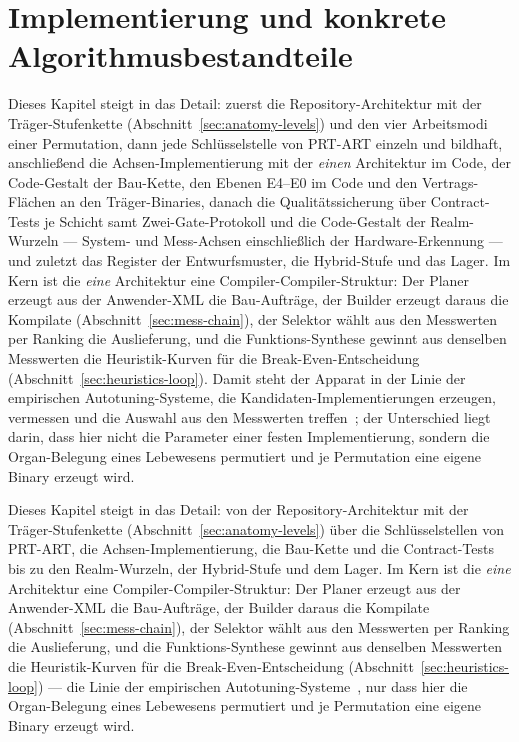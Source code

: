 \chapter{Implementierung und konkrete Algorithmusbestandteile}\label{ch:impl}

\begin{nurlang}
Dieses Kapitel steigt in das Detail: zuerst die Repository-Architektur mit der Träger-Stufenkette
(Abschnitt~\ref{sec:anatomy-levels}) und den vier Arbeitsmodi einer Permutation, dann jede Schlüsselstelle
von PRT-ART einzeln und bildhaft, anschließend die Achsen-Implementierung mit der \emph{einen} Architektur
im Code, der Code-Gestalt der Bau-Kette, den Ebenen E4--E0 im Code und den Vertrags-Flächen an den
Träger-Binaries, danach die Qualitätssicherung über Contract-Tests je Schicht samt Zwei-Gate-Protokoll
und die Code-Gestalt der Realm-Wurzeln --- System- und Mess-Achsen einschließlich der Hardware-Erkennung ---
und zuletzt das Register der Entwurfsmuster, die Hybrid-Stufe und das Lager. Im Kern ist die \emph{eine}
Architektur eine Compiler-Compiler-Struktur: Der Planer erzeugt aus der Anwender-XML die Bau-Aufträge, der
Builder erzeugt daraus die Kompilate (Abschnitt~\ref{sec:mess-chain}), der Selektor wählt aus den
Messwerten per Ranking die Auslieferung, und die Funktions-Synthese gewinnt aus denselben Messwerten die
Heuristik-Kurven für die Break-Even-Entscheidung
(Abschnitt~\ref{sec:heuristics-loop}). Damit steht der Apparat in der Linie der empirischen
Autotuning-Systeme, die Kandidaten-Implementierungen erzeugen, vermessen und die Auswahl aus den Messwerten
treffen~\cite{whaley2001atlas,frigo1998fftw,ansel2014opentuner,balaprakash2018autotuning}; der Unterschied
liegt darin, dass hier nicht die Parameter einer festen Implementierung, sondern die Organ-Belegung eines
Lebewesens permutiert und je Permutation eine eigene Binary erzeugt wird.
\end{nurlang}
\begin{nurkurz}
Dieses Kapitel steigt in das Detail: von der Repository-Architektur mit der Träger-Stufenkette
(Abschnitt~\ref{sec:anatomy-levels}) über die Schlüsselstellen von PRT-ART, die Achsen-Implementierung, die
Bau-Kette und die Contract-Tests bis zu den Realm-Wurzeln, der Hybrid-Stufe und dem Lager. Im Kern ist die
\emph{eine} Architektur eine Compiler-Compiler-Struktur: Der Planer erzeugt aus der Anwender-XML die
Bau-Aufträge, der Builder daraus die Kompilate (Abschnitt~\ref{sec:mess-chain}), der Selektor wählt aus den
Messwerten per Ranking die Auslieferung, und die Funktions-Synthese gewinnt aus denselben Messwerten die
Heuristik-Kurven für die Break-Even-Entscheidung
(Abschnitt~\ref{sec:heuristics-loop}) --- die Linie der empirischen
Autotuning-Systeme~\cite{whaley2001atlas,frigo1998fftw,ansel2014opentuner,balaprakash2018autotuning}, nur
dass hier die Organ-Belegung eines Lebewesens permutiert und je Permutation eine eigene Binary erzeugt wird.
\end{nurkurz}

